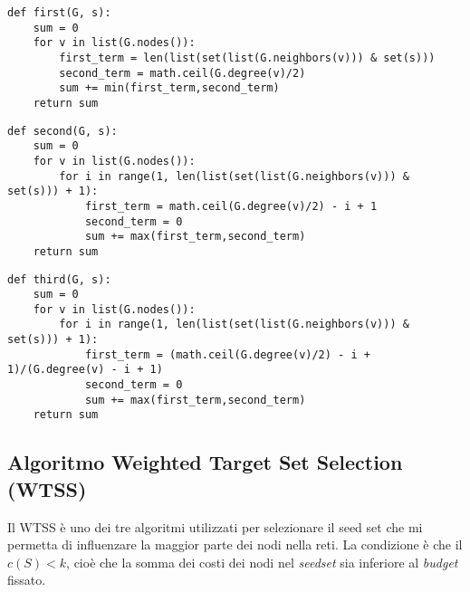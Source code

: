 \begin{code}
\begin{verbatim}
def first(G, s):
    sum = 0
    for v in list(G.nodes()):
        first_term = len(list(set(list(G.neighbors(v))) & set(s)))
        second_term = math.ceil(G.degree(v)/2)
        sum += min(first_term,second_term)
    return sum
\end{verbatim}
\end{code}

\begin{code}
\begin{verbatim}
def second(G, s):
    sum = 0
    for v in list(G.nodes()):
        for i in range(1, len(list(set(list(G.neighbors(v))) & set(s))) + 1):
            first_term = math.ceil(G.degree(v)/2) - i + 1
            second_term = 0
            sum += max(first_term,second_term)
    return sum
\end{verbatim}
\end{code}

\begin{code}
\begin{verbatim}
def third(G, s):
    sum = 0
    for v in list(G.nodes()):
        for i in range(1, len(list(set(list(G.neighbors(v))) & set(s))) + 1):
            first_term = (math.ceil(G.degree(v)/2) - i + 1)/(G.degree(v) - i + 1)
            second_term = 0
            sum += max(first_term,second_term)
    return sum
\end{verbatim}
\end{code}

\subsection{Algoritmo Weighted Target Set Selection (WTSS)}
Il WTSS è uno dei tre algoritmi utilizzati per selezionare il seed set che mi permetta di influenzare la maggior parte dei nodi nella reti. La condizione è che il $ c(S) < k $, cioè che la somma dei costi dei nodi nel \textit{seedset} sia inferiore al \textit{budget} fissato. 

